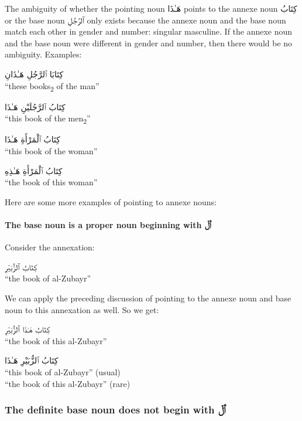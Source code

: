 \documentclass[
  10pt,
]{book}
\begin{document}
The ambiguity of whether the pointing noun \foreignlanguage{arabic}{هَـٰذَا} points to the annexe noun
\foreignlanguage{arabic}{کِتَابُ}
or the base noun
\foreignlanguage{arabic}{ٱلرَّجُلِ}
only exists because the annexe noun and the base noun match each other in gender and number: singular masculine.
If the annexe noun and the base noun were different in gender and number, then there would be no ambiguity. Examples:

\foreignlanguage{arabic}{کِتَابَا ٱلرَّجُلِ هَـٰذَانِ}\\
\enquote{these books\textsubscript{2} of the man}

\foreignlanguage{arabic}{کِتَابُ ٱلرَّجُلَيْنِ هَـٰذَا}\\
\enquote{this book of the men\textsubscript{2}}

\foreignlanguage{arabic}{کِتَابُ ٱلْمَرْأَةِ هَـٰذَا}\\
\enquote{this book of the woman}

\foreignlanguage{arabic}{کِتَابُ ٱلْمَرْأَةِ هَـٰذِهِ}\\
\enquote{the book of this woman}

Here are some more examples of pointing to annexe nouns:

\paragraph{\texorpdfstring{The base noun is a proper noun beginning with \foreignlanguage{arabic}{ٱَلْ}}{The base noun is a proper noun beginning with ٱَلْ}}\label{the-base-noun-is-a-proper-noun-beginning-with-ux671ux644}

Consider the annexation:

\foreignlanguage{arabic}{کِتَابُ ٱلزُّبَيْرِ}\\
\enquote{the book of al-Zubayr}

We can apply the preceding discussion of pointing to the annexe noun and base noun to this annexation as well. So we get:

\foreignlanguage{arabic}{کِتَابُ هَـٰذَا ٱلزُّبَيْرِ}\\
\enquote{the book of this al-Zubayr}

\foreignlanguage{arabic}{کِتَابُ ٱلزُّبَيْرِ هَـٰذَا}\\
\enquote{this book of al-Zubayr} (usual)\\
\enquote{the book of this al-Zubayr} (rare)

\subsubsection{\texorpdfstring{The definite base noun does not begin with \foreignlanguage{arabic}{ٱَلْ}}{The definite base noun does not begin with ٱَلْ}}\label{the-definite-base-noun-does-not-begin-with-ux671ux644}
\end{document}
